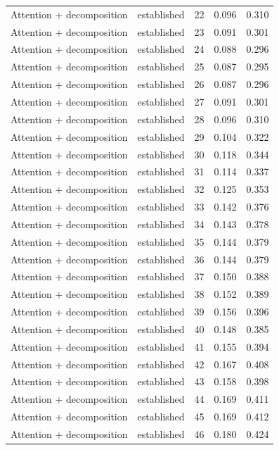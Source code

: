 \begin{tabular}{llrrr}
Attention + decomposition & established & 22 & 0.096 & 0.310 \\
Attention + decomposition & established & 23 & 0.091 & 0.301 \\
Attention + decomposition & established & 24 & 0.088 & 0.296 \\
Attention + decomposition & established & 25 & 0.087 & 0.295 \\
Attention + decomposition & established & 26 & 0.087 & 0.296 \\
Attention + decomposition & established & 27 & 0.091 & 0.301 \\
Attention + decomposition & established & 28 & 0.096 & 0.310 \\
Attention + decomposition & established & 29 & 0.104 & 0.322 \\
Attention + decomposition & established & 30 & 0.118 & 0.344 \\
Attention + decomposition & established & 31 & 0.114 & 0.337 \\
Attention + decomposition & established & 32 & 0.125 & 0.353 \\
Attention + decomposition & established & 33 & 0.142 & 0.376 \\
Attention + decomposition & established & 34 & 0.143 & 0.378 \\
Attention + decomposition & established & 35 & 0.144 & 0.379 \\
Attention + decomposition & established & 36 & 0.144 & 0.379 \\
Attention + decomposition & established & 37 & 0.150 & 0.388 \\
Attention + decomposition & established & 38 & 0.152 & 0.389 \\
Attention + decomposition & established & 39 & 0.156 & 0.396 \\
Attention + decomposition & established & 40 & 0.148 & 0.385 \\
Attention + decomposition & established & 41 & 0.155 & 0.394 \\
Attention + decomposition & established & 42 & 0.167 & 0.408 \\
Attention + decomposition & established & 43 & 0.158 & 0.398 \\
Attention + decomposition & established & 44 & 0.169 & 0.411 \\
Attention + decomposition & established & 45 & 0.169 & 0.412 \\
Attention + decomposition & established & 46 & 0.180 & 0.424 \\

\end{tabular}
